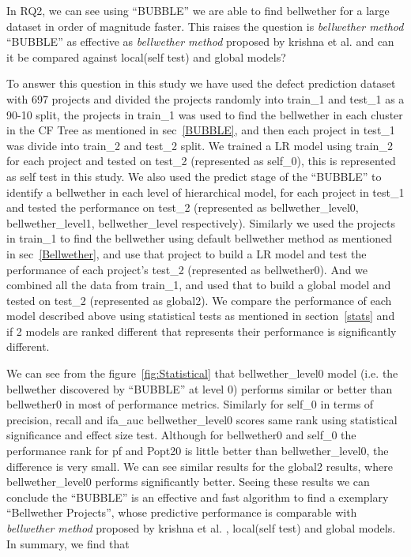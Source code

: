 \documentclass[10pt,journal,compsoc]{IEEEtran}
\begin{document}
In RQ2, we can see using ``BUBBLE'' we are able to find bellwether for a large dataset in order of magnitude faster. This raises the question is  \textit{bellwether method} ``BUBBLE'' as effective as \textit{bellwether method} proposed by krishna et al. and can it be compared against local(self test) and global models? 

To answer this question in this study we have used the defect prediction dataset with 697 projects and divided the projects randomly into train\_1 and test\_1 as a 90-10 split, the projects in train\_1 was used to find the bellwether in each cluster in the CF Tree as mentioned in sec~\ref{BUBBLE}, and then each project in test\_1 was divide into train\_2 and test\_2 split. We trained a LR model using train\_2 for each project and tested on test\_2 (represented as self\_0), this is represented as self test in this study. We also used the predict stage of the ``BUBBLE'' to identify a bellwether in each level of hierarchical model, for each project in test\_1 and tested the performance on test\_2 (represented as bellwether\_level0, bellwether\_level1, bellwether\_level respectively). Similarly we used the projects in train\_1 to find the bellwether using default bellwether method as mentioned in sec~\ref{Bellwether}, and use that project to build a LR model and test the performance of each project's test\_2 (represented as bellwether0). And we combined all the data from train\_1, and used that to build a global model and tested on test\_2 (represented as global2). We compare the performance of each model described above using statistical tests as mentioned in section~\ref{stats} and if 2 models are ranked different that represents their performance is significantly different. 

We can see from the figure~\ref{fig:Statistical} that bellwether\_level0 model (i.e. the bellwether discovered by ``BUBBLE'' at level 0) performs similar or  better than bellwether0 in most of performance metrics. Similarly for self\_0 in terms of precision, recall and ifa\_auc bellwether\_level0 scores same rank using statistical significance and effect size test. Although for bellwether0 and self\_0 the performance rank for pf and Popt20 is little better than bellwether\_level0, the difference is very small. We can see similar results for the global2 results, where bellwether\_level0 performs significantly better. Seeing these results we can conclude the ``BUBBLE'' is an effective and fast algorithm to find a exemplary ``Bellwether Projects'', whose predictive performance is comparable with  \textit{bellwether method} proposed by krishna et al. , local(self test) and global models. In summary, we find that
\end{document}

